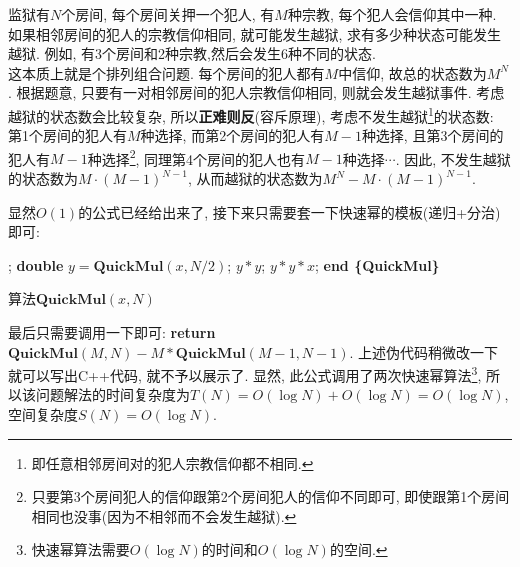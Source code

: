\documentclass{article}
\begin{document}
\pagebreak

\begin{homeworkProblem}
	监狱有$N$个房间, 每个房间关押一个犯人, 有$M$种宗教, 每个犯人会信仰其中一种. 如果相邻房间的犯人的宗教信仰相同, 就可能发生越狱, 求有多少种状态可能发生越狱. 例如, 有3个房间和2种宗教,然后会发生6种不同的状态. 
	\\

	\solution 这本质上就是个排列组合问题. 每个房间的犯人都有$M$中信仰, 故总的状态数为$M^N$. 根据题意, 只要有一对相邻房间的犯人宗教信仰相同, 则就会发生越狱事件. 
	考虑越狱的状态数会比较复杂, 所以\textbf{正难则反}(容斥原理), 考虑不发生越狱\footnote{即任意相邻房间对的犯人宗教信仰都不相同.}的状态数: 第1个房间的犯人有$M$种选择, 而第2个房间的犯人有$M-1$种选择, 且第3个房间的犯人有$M-1$种选择\footnote{只要第3个房间犯人的信仰跟第2个房间犯人的信仰不同即可, 即使跟第1个房间相同也没事(因为不相邻而不会发生越狱).}, 同理第4个房间的犯人也有$M-1$种选择$\cdots$. 因此, 不发生越狱的状态数为$M\cdot (M-1)^{N-1}$, 从而越狱的状态数为$M^N-M\cdot (M-1)^{N-1}$. 

	显然$O(1)$的公式已经给出来了, 接下来只需要套一下快速幂的模板(递归+分治)即可:
	\begin{algorithm}[H]
		\begin{algorithmic}[1]
		 
			\State {};
		\EndIf
		\State \textbf{double} $y=\textbf{QuickMul}(x, N/2)$; 
		 
			\State \Return $y\ast y$; 
		\Else {}
			\State \Return $y \ast y \ast x$; 
		\EndIf
		\State \textbf{end \{QuickMul\}}
		\end{algorithmic}
		\caption{算法$\textbf{QuickMul}(x, N)$}
		\label{alg:QuickMul}
	\end{algorithm}
	最后只需要调用一下即可: \textbf{return} $\textbf{QuickMul}(M, N)-M\ast \textbf{QuickMul}(M-1, N-1)$. 上述伪代码稍微改一下就可以写出C++代码, 就不予以展示了. 显然, 此公式调用了两次快速幂算法\footnote{快速幂算法需要$O(\log N)$的时间和$O(\log N)$的空间.}, 所以该问题解法的时间复杂度为$T(N)=O(\log N)+O(\log N)=O(\log N)$, 空间复杂度$S(N)=O(\log N)$.
	\newpage
\end{homeworkProblem}

\pagebreak
\end{document}
